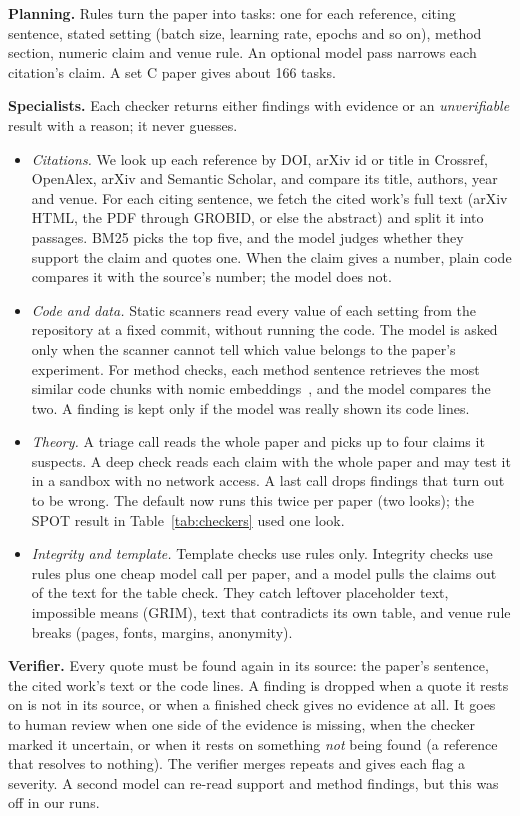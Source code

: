 \documentclass[11pt,a4paper]{article}
\begin{document}
\textbf{Planning.} Rules turn the paper into tasks: one for each reference, citing sentence,
stated setting (batch size, learning rate, epochs and so on), method section, numeric claim and
venue rule. An optional model pass narrows each citation's claim. A set C paper
gives about 166 tasks.

\textbf{Specialists.} Each checker returns either findings with evidence or an \emph{unverifiable}
result with a reason; it never guesses.
\begin{itemize}
\item \emph{Citations.} We look up each reference by DOI, arXiv id or title in Crossref, OpenAlex,
arXiv and Semantic Scholar, and compare its title, authors, year and venue. For each citing
sentence, we fetch the cited work's full text (arXiv HTML, the PDF through GROBID, or else the
abstract) and split it into passages. BM25 picks the top five, and the model judges whether they
support the claim and quotes one. When the claim gives a number, plain code compares it with the
source's number; the model does not.
\item \emph{Code and data.} Static scanners read every value of each setting from the repository
at a fixed commit, without running the code. The model is asked only when the scanner cannot tell
which value belongs to the paper's experiment. For method checks, each method sentence retrieves
the most similar code chunks with nomic embeddings~\cite{nomic}, and the model compares the two.
A finding is kept only if the model was really shown its code lines.
\item \emph{Theory.} A triage call reads the whole paper and picks up to four claims it suspects.
A deep check reads each claim with the whole paper and may test it in a sandbox with no network
access. A last call drops findings that turn out to be wrong. The default now runs this twice per
paper (two looks); the SPOT result in Table~\ref{tab:checkers} used one look.
\item \emph{Integrity and template.} Template checks use rules only. Integrity checks use rules
plus one cheap model call per paper, and a model pulls the claims out of the text for the table
check. They catch leftover placeholder text, impossible means (GRIM), text that contradicts its own
table, and venue rule breaks (pages, fonts, margins, anonymity).
\end{itemize}

\textbf{Verifier.} Every quote must be found again in its source: the paper's sentence, the cited
work's text or the code lines. A finding is dropped when a quote it rests on is not in its source,
or when a finished check gives no evidence at all. It goes to human review when one side of the
evidence is missing, when the checker marked it uncertain, or when it rests on something
\emph{not} being found (a reference that resolves to nothing). The verifier merges repeats and
gives each flag a severity. A second model can re-read support and method findings, but this was
off in our runs.
\end{document}

